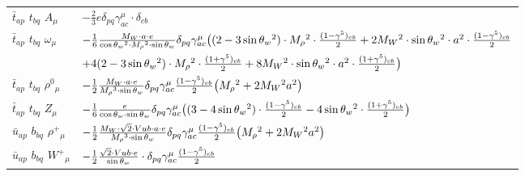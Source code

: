 \begin{center}
\begin{tabular}{|l|l|}
$\bar{t}{}_{a p }$ \phantom{-} $t{}_{b q }$ \phantom{-} ${A}_{\mu }$ \phantom{-}  &
	$-\frac{2}{3} e\delta_{p q} \gamma_{a c}^\mu \cdot \delta_{c b} $\\[2mm]
$\bar{t}{}_{a p }$ \phantom{-} $t{}_{b q }$ \phantom{-} $\omega{}_{\mu }$ \phantom{-}  &
	$-\frac{1}{6}\frac{ M_W \cdot a \cdot e}{ \cos{\theta}_w{}^2  \cdot M_\rho{}^3  \cdot \sin{\theta}_w}\delta_{p q} \gamma_{a c}^\mu \big( (2-3 \sin{\theta}_w {}^2)\cdot  M_\rho{}^2 \cdot {(1-\gamma^5)_{c b}\over 2} +2 M_W{}^2 \cdot  \sin{\theta}_w{}^2 \cdot  a{}^2 \cdot {(1-\gamma^5)_{c b}\over 2} $ \\[2mm]
  & $+4 (2-3 \sin{\theta}_w {}^2)\cdot  M_\rho{}^2 \cdot {(1+\gamma^5)_{c b}\over 2} +8 M_W{}^2 \cdot  \sin{\theta}_w{}^2 \cdot  a{}^2 \cdot {(1+\gamma^5)_{c b}\over 2} \big)$\\[2mm]
$\bar{t}{}_{a p }$ \phantom{-} $t{}_{b q }$ \phantom{-} $\rho^0{}_{\mu }$ \phantom{-}  &
	$-\frac{1}{2}\frac{ M_W \cdot a \cdot e}{ M_\rho{}^3  \cdot \sin{\theta}_w}\delta_{p q} \gamma_{a c}^\mu {(1-\gamma^5)_{c b}\over 2} \big( M_\rho{}^2 +2 M_W{}^2  a{}^2 \big)$\\[2mm]
$\bar{t}{}_{a p }$ \phantom{-} $t{}_{b q }$ \phantom{-} ${Z}_{\mu }$ \phantom{-}  &
	$-\frac{1}{6}\frac{ e}{ \cos{\theta}_w \cdot \sin{\theta}_w}\delta_{p q} \gamma_{a c}^\mu \big( (3-4 \sin{\theta}_w {}^2)\cdot {(1-\gamma^5)_{c b}\over 2} -4 \sin{\theta}_w{}^2 \cdot {(1+\gamma^5)_{c b}\over 2} \big)$\\[2mm]
$\bar{u}{}_{a p }$ \phantom{-} $b{}_{b q }$ \phantom{-} $\rho^+{}_{\mu }$ \phantom{-}  &
	$-\frac{1}{2}\frac{ M_W \cdot\sqrt{2} \cdot Vub \cdot a \cdot e}{ M_\rho{}^3  \cdot \sin{\theta}_w}\delta_{p q} \gamma_{a c}^\mu {(1-\gamma^5)_{c b}\over 2} \big( M_\rho{}^2 +2 M_W{}^2  a{}^2 \big)$\\[2mm]
$\bar{u}{}_{a p }$ \phantom{-} $b{}_{b q }$ \phantom{-} $W^+{}_{\mu }$ \phantom{-}  &
	$-\frac{1}{2}\frac{\sqrt{2} \cdot Vub \cdot e}{ \sin{\theta}_w}\cdot \delta_{p q} \gamma_{a c}^\mu {(1-\gamma^5)_{c b}\over 2} $\\ \hline
\end{tabular}


\end{center}
